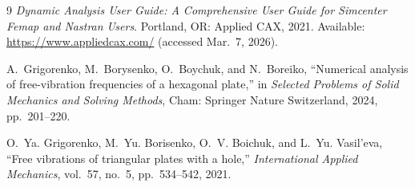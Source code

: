 \begin{thebibliography}{9}
\emph{Dynamic Analysis User Guide: A Comprehensive User Guide for Simcenter Femap and Nastran Users}.
Portland, OR: Applied CAX, 2021. Available: \url{https://www.appliedcax.com/} (accessed Mar.~7, 2026).

A.~Grigorenko, M.~Borysenko, O.~Boychuk, and N.~Boreiko,
``Numerical analysis of free-vibration frequencies of a hexagonal plate,''
in \emph{Selected Problems of Solid Mechanics and Solving Methods},
Cham: Springer Nature Switzerland, 2024, pp.~201--220.

O.~Ya. Grigorenko, M.~Yu. Borisenko, O.~V. Boichuk, and L.~Yu. Vasil’eva,
``Free vibrations of triangular plates with a hole,''
\emph{International Applied Mechanics}, vol.~57, no.~5, pp.~534--542, 2021.
\end{thebibliography}
